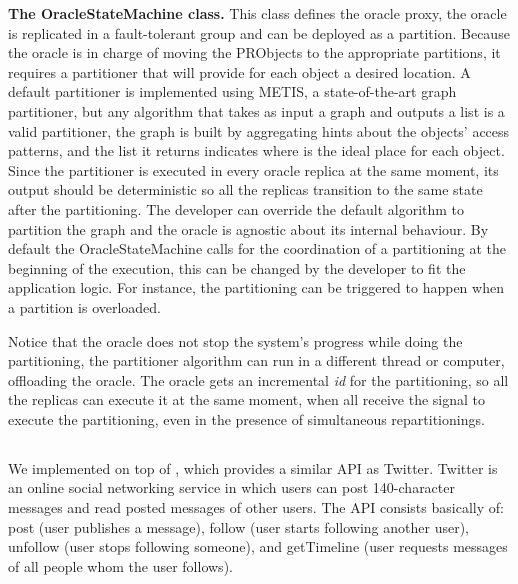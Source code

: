 \textbf{The OracleStateMachine class.} This class defines the oracle proxy, the oracle is replicated in a fault-tolerant
group and can be deployed as a partition. Because the oracle is in charge of moving the PRObjects to the appropriate 
partitions, it requires a partitioner that will provide for each object a desired location. A default partitioner is implemented using METIS, a state-of-the-art graph partitioner, but any algorithm that takes as input a graph and outputs a list is a valid
partitioner, the graph is built by aggregating hints about the objects' access patterns, and the list it returns indicates where
is the ideal place for each object. Since the partitioner is executed in every oracle replica at the same moment,
its output should be deterministic so all the replicas transition to the same state after the partitioning. 
The developer can override the default algorithm to partition the graph and the oracle is agnostic about its internal behaviour.
By default the OracleStateMachine calls for the coordination of a partitioning at the beginning of the execution, this can be
changed by the developer to fit the application logic. For instance, the partitioning can be triggered to 
happen when a partition is overloaded.

Notice that the oracle does not stop the system's progress while doing the partitioning, the partitioner algorithm can
 run in a different thread or computer, offloading the oracle. The oracle gets an incremental \emph{id} for the partitioning, 
 so all the replicas can execute it at the same moment, when all receive the signal to execute the partitioning, 
 even in the presence of simultaneous repartitionings.

\subsection{\appname}

We implemented \appname{} on top of \libname{}, which provides a similar API as Twitter. Twitter is an online social networking service in which users can post 140-character messages and read posted messages of other users. The API consists basically of: post (user publishes a message), follow (user starts following another user), unfollow (user stops following someone), and getTimeline (user requests messages of all people whom the user follows).

